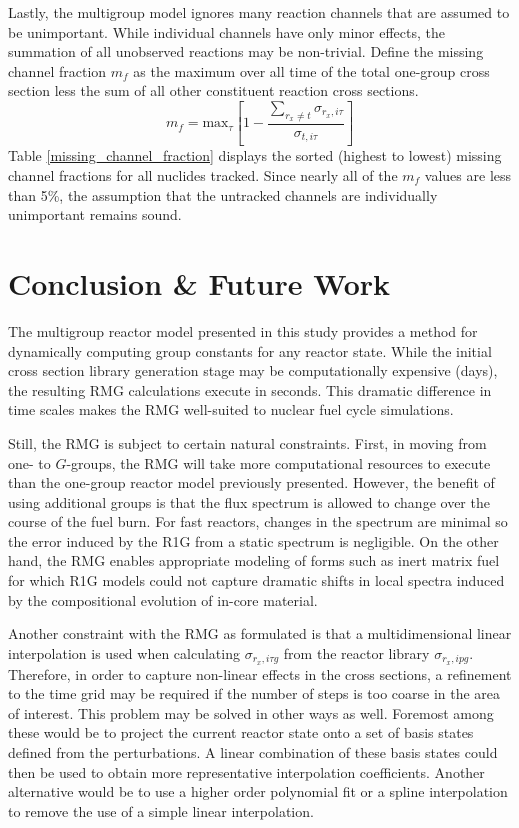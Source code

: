 Lastly, the multigroup model ignores many reaction channels that are assumed to be 
unimportant.  While individual channels have only minor effects, the summation of all 
unobserved reactions may be non-trivial.  Define the missing channel fraction $m_f$ as the maximum 
over all time of the total one-group cross section less the sum of all other constituent reaction 
cross sections.
\begin{equation}
\label{mcf}
m_f = \mbox{max}_{\tau}\left[1 - \frac{\sum_{r_x \ne t}\sigma_{r_x,i\tau}}{\sigma_{t,i\tau}}\right]
\end{equation}
Table \ref{missing_channel_fraction} displays the sorted (highest to lowest) missing 
channel fractions for all nuclides tracked.  Since nearly all of the $m_f$ values are
less than 5\%, the assumption that the untracked channels are individually unimportant
remains sound.




\section{Conclusion \& Future Work}
\label{mg_sec:conc}
The multigroup reactor model presented in this study provides a method for dynamically
computing group constants for any reactor state.  While the initial cross section library
generation stage may be computationally expensive (days), the resulting RMG calculations 
execute in seconds.  This dramatic difference in time scales
makes the RMG well-suited to nuclear fuel cycle simulations.

Still, the RMG is subject to certain natural constraints.  First, in moving from one- to $G$-groups,
the RMG will take more computational resources to execute than the one-group
reactor model previously presented.  However, the benefit of using additional groups is that the flux
spectrum is allowed to change over the course of the fuel burn.  For fast reactors,
changes in the spectrum are minimal so the error induced by the R1G from a static spectrum
is negligible.  On the other hand, the RMG enables appropriate modeling of forms such as inert matrix 
fuel for which R1G models could not capture dramatic shifts in local spectra induced by the compositional
evolution of in-core material.

Another constraint with the RMG as formulated is that a multidimensional linear interpolation is 
used when calculating $\sigma_{r_x,i\tau g}$ from the reactor library $\sigma_{r_x,ipg}$.  Therefore, 
in order to capture non-linear effects in the cross sections, a refinement to the time grid may 
be required if the number of steps is too coarse in the area of interest.  This problem may be solved
in other ways as well.  Foremost among these would be to project the current reactor state onto a 
set of basis states defined from the perturbations.  A linear combination of these basis states could then
be used to obtain more representative interpolation coefficients.  Another alternative would be to use a 
higher order polynomial fit or a spline interpolation to remove the use of a simple linear interpolation. 

